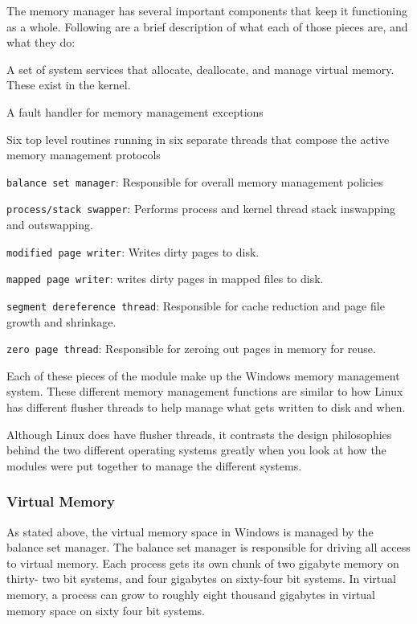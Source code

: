 \documentclass[10pt,letterpaper,onecolumn,draftclsnofoot]{IEEEtran}
\begin{document}
The memory manager has several important components that keep it functioning as a
whole. Following are a brief description of what each of those pieces are, and what
they do: \cite{internals2}
\begin{description}
	\item A set of system services that allocate, deallocate, and manage virtual
	memory. These exist in the kernel.
	\item A fault handler for memory management exceptions
	\item Six top level routines running in six separate threads that compose
	the active memory management protocols

	\begin{description}
		\item \texttt{balance set manager}: Responsible for overall
		memory management policies
		\item \texttt{process/stack swapper}: Performs process and
		kernel thread stack inswapping and outswapping.
		\item \texttt{modified page writer}: Writes dirty pages to
		disk.
		\item \texttt{mapped page writer}: writes dirty pages in
		mapped files to disk.
		\item \texttt{segment dereference thread}: Responsible for
		cache reduction and page file growth and shrinkage.
		\item \texttt{zero page thread}: Responsible for zeroing
		out pages in memory for reuse.
	\end{description}
\end{description}
Each of these pieces of the module make up the Windows memory management system.
These different memory management functions are similar to how Linux has different
flusher threads to help manage what gets written to disk and when.

Although Linux does have flusher threads, it contrasts the design philosophies behind
the two different operating systems greatly when you look at how the modules were put together to manage the different systems.

\subsubsection{Virtual Memory}
As stated above, the virtual memory space in Windows is managed by the balance
set manager. The balance set manager is responsible for driving all access
to virtual memory. Each process gets its own chunk of two gigabyte memory on thirty-
two bit systems, and four gigabytes on sixty-four bit systems. In virtual memory,
a process can grow to roughly eight thousand gigabytes in virtual memory space on
sixty four bit systems.\cite{internals2}
\end{document}
